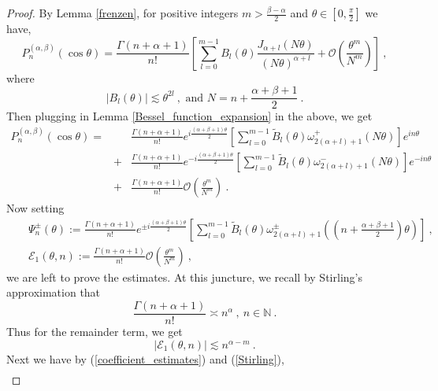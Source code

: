 \documentclass[12pt]{amsart}
\theoremstyle{definition}
\newcommand{\N}{\mathbb N}%
\numberwithin{equation}{section}
\begin{document}
\begin{proof}
By Lemma \ref{frenzen}, for positive integers $m>\frac{\beta - \alpha}{2}$ and $\theta \in \left[0,\frac{\pi}{2}\right]$ we have,
\begin{equation*}
P^{(\alpha,\beta)}_n(\cos \theta)= \frac{\Gamma(n+\alpha+1)}{n!} \left[\sum_{l=0}^{m-1}B_l(\theta)\frac{J_{\alpha+l}(N\theta)}{{\left(N\theta\right)}^{\alpha + l}} + \mathcal{O}\left(\frac{\theta^m}{N^m}\right)\right]\:,
\end{equation*}
where
\begin{equation*}
\left|B_l(\theta)\right| \lesssim \theta^{2l}\:,\text{ and }N=n+\frac{\alpha + \beta +1}{2}\:.
\end{equation*}
Then plugging in Lemma \ref{Bessel_function_expansion} in the above, we get
\begin{eqnarray*}
P^{(\alpha,\beta)}_n(\cos \theta)=&& \frac{\Gamma(n+\alpha+1)}{n!}e^{i\frac{(\alpha + \beta +1)\theta}{2}}\left[\sum_{l=0}^{m-1}
\tilde{B}_l(\theta)\omega^+_{2(\alpha + l)+1}(N\theta)\right]e^{in\theta} \\
&+& \frac{\Gamma(n+\alpha+1)}{n!}e^{-i\frac{(\alpha + \beta +1)\theta}{2}}\left[\sum_{l=0}^{m-1}
\tilde{B}_l(\theta)\omega^-_{2(\alpha + l)+1}(N\theta)\right]e^{-in\theta} \\
&+& \frac{\Gamma(n+\alpha+1)}{n!}\mathcal{O}\left(\frac{\theta^m}{N^m}\right)\:.
\end{eqnarray*}
Now setting
\begin{eqnarray*}
&&\Psi^\pm_n(\theta) :=\frac{\Gamma(n+\alpha+1)}{n!}e^{\pm i\frac{(\alpha + \beta +1)\theta}{2}}\left[\sum_{l=0}^{m-1}
\tilde{B}_l(\theta)\omega^\pm_{2(\alpha + l)+1}\left(\left(n+\frac{\alpha + \beta +1}{2}\right)\theta\right)\right]\:,\\
&&\mathcal{E}_1(\theta,n):=\frac{\Gamma(n+\alpha+1)}{n!}\mathcal{O}\left(\frac{\theta^m}{N^m}\right)\:,
\end{eqnarray*}
we are left to prove the estimates. At this juncture, we recall by Stirling's approximation that
\begin{equation} \label{Stirling}
\frac{\Gamma(n+\alpha+1)}{n!} \asymp n^\alpha\:,\:n \in \N\:.
\end{equation}
Thus for the remainder term, we get
\begin{equation*}
\left|\mathcal{E}_1(\theta,n)\right| \lesssim n^{\alpha -m}\:.
\end{equation*}
Next we have by (\ref{coefficient_estimates}) and (\ref{Stirling}),
\begin{eqnarray*}

\end{eqnarray*}
\end{proof}
\end{document}

